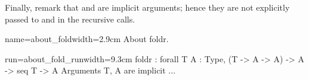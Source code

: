Finally, remark that  and  are implicit arguments; hence they
are not explicitly passed to  and  in the recursive
calls.

\begin{coq-left}{name=about_fold}{width=2.9cm}
About foldr.
$~$
$~$
\end{coq-left}
\begin{coqout-right}{run=about_fold_run}{width=9.3cm}
foldr : forall T A : Type,
  (T -> A -> A) -> A -> seq T -> A
Arguments T, A are implicit ...
\end{coqout-right}


%
%


